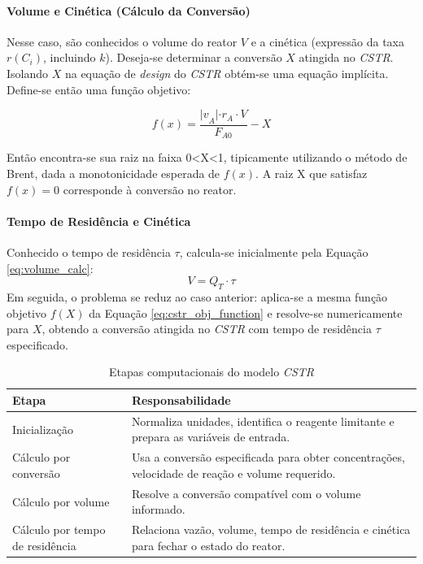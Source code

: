 \paragraph{Volume e Cinética (Cálculo da Conversão)}

Nesse caso, são conhecidos o volume do reator $V$ e a cinética (expressão da taxa $r ( C_{i} )$, incluindo $k$). Deseja-se determinar a conversão $X$ atingida no \textit{CSTR}. Isolando $X$ na equação de \textit{design} do \textit{CSTR} obtém-se uma equação implícita. Define-se então uma função objetivo:

\begin{equation}
f ( x ) = \frac{{| v}_{A} | \cdot r_{A} \cdot V}{F_{A 0}} - X
\label{eq:cstr_obj_function}
\end{equation}

Então encontra-se sua raiz na faixa 0<X<1, tipicamente utilizando o método de Brent, dada a monotonicidade esperada de $f ( x )$. A raiz X que satisfaz $f ( x ) = 0$ corresponde à conversão no reator.

\paragraph{Tempo de Residência e Cinética}

Conhecido o tempo de residência $\tau$, calcula-se inicialmente pela Equação \ref{eq:volume_calc}:
\begin{equation}
V = Q_{T} \cdot \tau
\label{eq:volume_calc}
\end{equation}
Em seguida, o problema se reduz ao caso anterior: aplica-se a mesma função objetivo $f ( X )$ da Equação \ref{eq:cstr_obj_function} e resolve-se numericamente para $X$, obtendo a conversão atingida no \textit{CSTR} com tempo de residência $\tau$ especificado.

\begin{table}[H]
    \centering
    \caption{Etapas computacionais do modelo \textit{CSTR}}
    \label{tab:metodologia-cstr-etapas}
    \small
    \begin{tabular}{p{}p{}}
        \hline
        \textbf{Etapa} & \textbf{Responsabilidade} \\
        \hline
        Inicialização & Normaliza unidades, identifica o reagente limitante e prepara as variáveis de entrada. \\
        Cálculo por conversão & Usa a conversão especificada para obter concentrações, velocidade de reação e volume requerido. \\
        Cálculo por volume & Resolve a conversão compatível com o volume informado. \\
        Cálculo por tempo de residência & Relaciona vazão, volume, tempo de residência e cinética para fechar o estado do reator. \\
        \hline
    \end{tabular}
\end{table}

